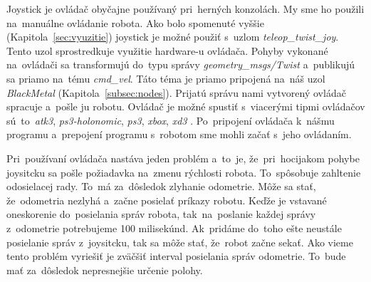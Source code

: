 Joystick je ovládač obyčajne používaný pri~herných konzolách. My sme ho použili na~manuálne ovládanie robota. Ako bolo
spomenuté vyššie (Kapitola~\ref{sec:vyuzitie}) joystick je možné použiť s~uzlom \textit{teleop\_twist\_joy}. Tento uzol
sprostredkuje využitie hardware-u ovládača. Pohyby vykonané na~ovládači sa transformujú do~typu správy
\textit{geometry\_msgs/Twist} a~publikujú sa priamo na~tému \textit{cmd\_vel}. Táto téma je priamo pripojená
na~náš uzol \textit{BlackMetal} (Kapitola~\ref{subsec:nodes}). Prijatú správu nami vytvorený ovládač spracuje a~pošle
ju robotu. Ovládač je možné spustiť s~viacerými tipmi ovládačov sú~to~\textit{atk3}, \textit{ps3-holonomic},
\textit{ps3}, \textit{xbox}, \textit{xd3} \cite{teleopjoy}. Po~pripojení ovládača k~nášmu programu a~prepojení
programu s~robotom sme mohli začať s~jeho ovládaním.

Pri~používaní ovládača nastáva jeden problém a~to~je, že~pri~hocijakom pohybe joysitcku sa pošle požiadavka na~zmenu
rýchlosti robota. To~spôsobuje zahltenie odosielacej rady. To~má za~dôsledok zlyhanie odometrie. Môže sa stať,
že~odometria nezlyhá a~začne posielať príkazy robotu. Keďže je vstavané oneskorenie do~posielania správ robota,
tak~na~poslanie každej správy z~odometrie potrebujeme 100 milisekúnd. Ak~pridáme do~toho ešte neustále posielanie správ
z~joysitcku, tak sa môže stať, že~robot začne sekať. Ako vieme tento problém vyriešiť je zväčšiť interval posielania
správ odometrie. To~bude mať za~dôsledok nepresnejšie určenie polohy.


